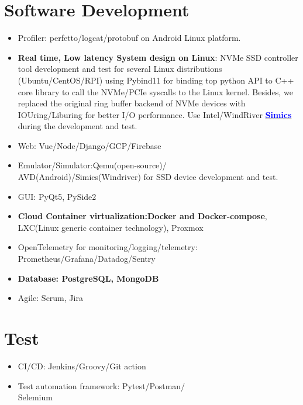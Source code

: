 \documentclass[11pt]{article}
\begin{document}
\begin{multicols*}{2}
\vspace{-15em}
\section*{Software Development}\label{software-dev}

\begin{itemize}[noitemsep]
    \item Profiler: perfetto/logcat/protobuf on Android Linux platform.
    \item \textbf{Real time, Low latency System design on Linux}: NVMe SSD controller tool development and test 
    for several Linux distributions (Ubuntu/CentOS/RPI) using Pybind11 
    for binding top python API to C++ core library to call the NVMe/PCIe syscalls to the Linux kernel.
    Besides, we replaced the original ring buffer backend of  NVMe devices with IOUring/Liburing 
    for better I/O performance. Use Intel/WindRiver \href{https://www.windriver.com/products/simics}{\textbf{\textcolor{blue}{Simics}}} during the development and test.
    \item Web: Vue/Node/Django/GCP/Firebase
    \item Emulator/Simulator:Qemu(open-source)/\\AVD(Android)/Simics(Windriver) for SSD device development and test.
    \item GUI: PyQt5, PySide2
    \item \textbf{Cloud Container virtualization:Docker and Docker-compose}, LXC(Linux generic container technology), Proxmox
    \item OpenTelemetry for monitoring/logging/telemetry:\\ Prometheus/Grafana/Datadog/Sentry
    \item \textbf{Database: PostgreSQL, MongoDB}
    \item Agile: Scrum, Jira
\end{itemize}

\vspace{-20em}

\section*{Test}
\begin{itemize}[noitemsep]
    \item CI/CD: Jenkins/Groovy/Git action
    \item Test automation framework: Pytest/Postman/\\Selemium
\end{itemize}


\end{multicols*}
\end{document}

